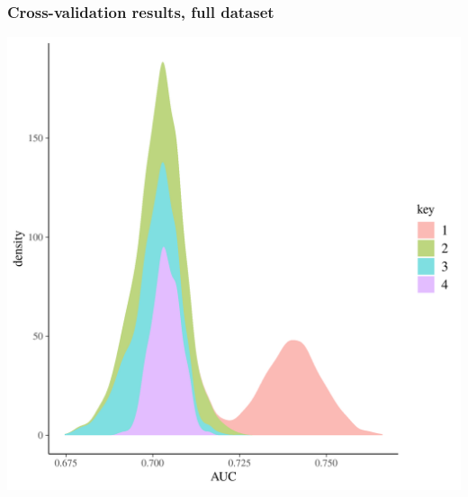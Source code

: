 \documentclass{beamer}
\begin{document}
%
%


\begin{frame}
  \frametitle{Cross-validation results, full dataset}

  \includegraphics[width=\textwidth,height=0.8\textheight,keepaspectratio=true]{../results/figure/fold_auc}

\end{frame}
\end{document}
